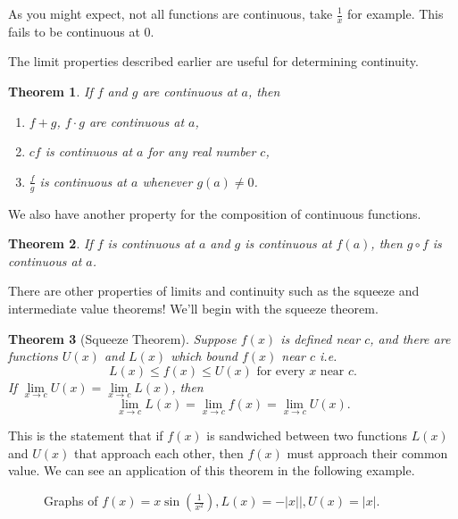 \documentclass[12pt]{article}
\newcommand{\abs}[1]{ \left| #1 \right| }
\newtheorem{thm}{Theorem}[section]
\theoremstyle{definition}
\theoremstyle{plain}
\numberwithin{equation}{section}
\begin{document}
As you might expect, not all functions are continuous, take $\frac{1}{x}$ for example. This fails to be continuous at $0$.

The limit properties described earlier are useful for determining continuity.
\begin{thm}
	If $f$ and $g$ are continuous at $a$, then
	\begin{enumerate}
		\item $f+g$, $f\cdot g$ are continuous at $a$,
		\item $cf$ is continuous at $a$ for any real number $c$,
		\item $\frac{f}{g}$ is continuous at $a$ whenever $g(a)\neq 0$.
	\end{enumerate}
\end{thm}

We also have another property for the composition of continuous functions.

\begin{thm}
	If $f$ is continuous at $a$ and $g$ is continuous at $f(a)$, then $g\circ f$ is continuous at $a$.
\end{thm}


There are other properties of limits and continuity such as the squeeze and intermediate value theorems! We'll begin with the squeeze theorem.

\begin{thm}[Squeeze Theorem]
  Suppose $f(x)$ is defined near $c$, and there are functions $U(x)$ and $L(x)$ which bound $f(x)$ near $c$ i.e.
  \[
L(x)\leq f(x)\leq U(x)\text{ for every }x\text{ near }c.
  \]
  If $\lim\limits_{x\to c} U(x)= \lim\limits_{x\to c} L(x)$, then
  \[
  \lim\limits_{x\to c} L(x)=\lim\limits_{x\to c} f(x) =\lim\limits_{x\to c} U(x).
  \]
\end{thm}

  This is the statement that if $f(x)$ is sandwiched between two functions $L(x)$ and $U(x)$ that approach each other, then $f(x)$ must approach their common value. We can see an application of this theorem in the following example.

  \begin{figure}[h]
    \centering
    \label{fig:Squeeze}
    \caption{Graphs of $f(x)=x\sin\left(\frac{1}{x^2}\right), L(x)=-\abs{x}|, U(x)=\abs{x}$.}
  \end{figure}
\end{document}
